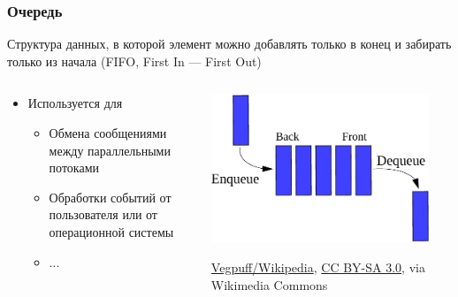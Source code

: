 \documentclass[aspectratio=169]{beamer}
\begin{document}
\begin{frame}
    \frametitle{Очередь}
    Структура данных, в которой элемент можно добавлять только в конец и забирать только из начала (FIFO, First In --- First Out)
    \begin{columns}
        \begin{column}{0.6\textwidth}
            \begin{itemize}
                \item Используется для
                      \begin{itemize}
                          \item Обмена сообщениями между параллельными потоками
                          \item Обработки событий от пользователя или от операционной системы
                          \item ...
                      \end{itemize}
            \end{itemize}
        \end{column}
        \begin{column}{0.4\textwidth}
            \begin{center}
                \includegraphics[width=0.9\textwidth]{queue.pdf}
                \begin{tiny}
                    \href{https://commons.wikimedia.org/wiki/File:Data_Queue.svg}{Vegpuff/Wikipedia}, \href{https://creativecommons.org/licenses/by-sa/3.0}{CC BY-SA 3.0}, via Wikimedia Commons
                \end{tiny}
            \end{center}
        \end{column}
    \end{columns}
\end{frame}
\end{document}
